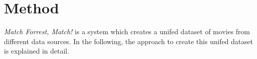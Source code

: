 \section{Method}
\label{sec_method}

\emph{Match Forrest, Match!} is a system which creates a unifed dataset of movies from different data sources.
In the following, the approach to create this unifed dataset is explained in detail.






